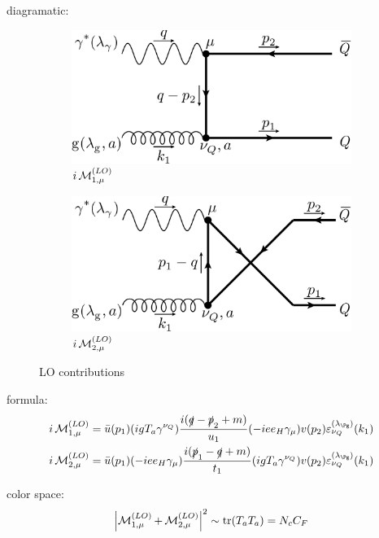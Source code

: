 diagramatic:
\begin{figure}[ht!]
	\centering
	\begin{subfigure}[t]{.4\textwidth}
		\includegraphics[width=\textwidth]{pyfeyn/lo-a}
		\caption{$i\operatorname{\mathcal M}^{(LO)}_{1,\mu}$}
	\end{subfigure}\hspace{.15\textwidth}%
	\begin{subfigure}[t]{.4\textwidth}
		\includegraphics[width=\textwidth]{pyfeyn/lo-b}
		\caption{$i\operatorname{\mathcal M}^{(LO)}_{2,\mu}$}
	\end{subfigure}
	\caption{LO contributions}\label{fig:FeynLO}
\end{figure}

formula:
\begin{align}
i\Md^{(LO)}_{1,\mu} &= \bar u(p_1)(igT_a\gamma^{\nu_Q})\frac{i(\slashed{q}-\slashed{p}_2+m)}{u_1}(-i e e_H \gamma_\mu)v(p_2)\varepsilon^{(\lambda_{\Pg})}_{\nu_Q}(k_1)\\
i\Md^{(LO)}_{2,\mu} &= \bar u(p_1)(-i e e_H \gamma_\mu)\frac{i(\slashed{p}_1-\slashed{q}+m)}{t_1}(igT_a\gamma^{\nu_Q})v(p_2)\varepsilon^{(\lambda_{\Pg})}_{\nu_Q}(k_1)
\end{align}

color space:
\begin{equation}
\left|\operatorname{\mathcal M}^{(LO)}_{1,\mu}+\operatorname{\mathcal M}^{(LO)}_{2,\mu}\right|^2 \sim \operatorname{\text{tr}}(T_a T_a) = N_c C_F
\end{equation}

